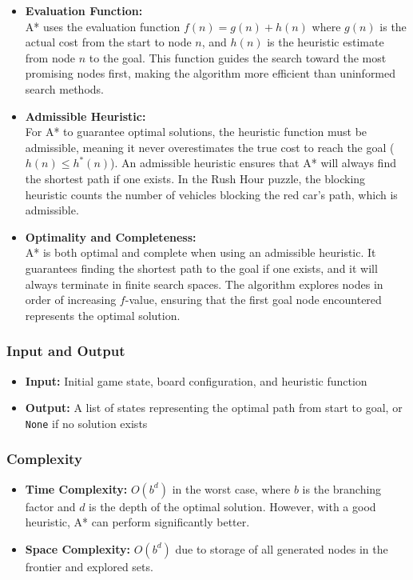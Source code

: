 \begin{itemize}
    \item \textbf{Evaluation Function:} \\
    A* uses the evaluation function $f(n) = g(n) + h(n)$ where $g(n)$ is the actual cost from the start to node $n$, and $h(n)$ is the heuristic estimate from node $n$ to the goal. This function guides the search toward the most promising nodes first, making the algorithm more efficient than uninformed search methods.

    \item \textbf{Admissible Heuristic:} \\
    For A* to guarantee optimal solutions, the heuristic function must be admissible, meaning it never overestimates the true cost to reach the goal ($h(n) \leq h^*(n)$). An admissible heuristic ensures that A* will always find the shortest path if one exists. In the Rush Hour puzzle, the blocking heuristic counts the number of vehicles blocking the red car's path, which is admissible.

    \item \textbf{Optimality and Completeness:} \\
    A* is both optimal and complete when using an admissible heuristic. It guarantees finding the shortest path to the goal if one exists, and it will always terminate in finite search spaces. The algorithm explores nodes in order of increasing $f$-value, ensuring that the first goal node encountered represents the optimal solution.
\end{itemize}

\subsubsection*{Input and Output}
\begin{itemize}
    \item \textbf{Input:} Initial game state, board configuration, and heuristic function
    \item \textbf{Output:} A list of states representing the optimal path from start to goal, or \texttt{None} if no solution exists
\end{itemize}

\subsubsection*{Complexity}
\begin{itemize}
    \item \textbf{Time Complexity:} $O(b^d)$ in the worst case, where $b$ is the branching factor and $d$ is the depth of the optimal solution. However, with a good heuristic, A* can perform significantly better.
    \item \textbf{Space Complexity:} $O(b^d)$ due to storage of all generated nodes in the frontier and explored sets.
\end{itemize}
